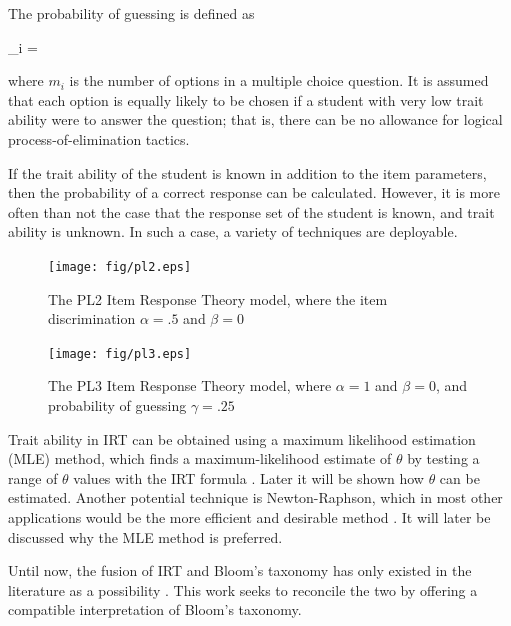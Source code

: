 The probability of guessing is defined as

\begin{equations}
  \gamma_i = 
\end{equations}

where $m_i$ is the number of options in a multiple choice question.  It is
assumed that each option is equally likely to be chosen if a student with
very low trait ability were to answer the question; that is, there can be
no allowance for logical process-of-elimination tactics.

If the trait ability of the student is known in addition to the item
parameters, then the probability of a correct response can be calculated.
However, it is more often than not the case that the response set of the
student is known, and trait ability is unknown.  In such a case, a variety of
techniques are deployable.

\begin{figure}[p!]
 \label{fig:pl2}
 \texttt{[image: fig/pl2.eps]} 
 \caption{The PL2 Item Response Theory model, where the item discrimination 
 $\alpha=.5$ and $\beta=0$}
\end{figure}

\begin{figure}[p!]
 \label{fig:pl3}
 \texttt{[image: fig/pl3.eps]} 
 \caption{The PL3 Item Response Theory model, where $\alpha=1$ and $\beta=0$,
 and probability of guessing $\gamma=.25$}
\end{figure}

Trait ability in IRT can be obtained using a maximum likelihood estimation
(MLE) method, which finds a maximum-likelihood estimate of $\theta$ by testing
a range of $\theta$ values with the IRT formula \cite{baker2004}.  Later it
will be shown how $\theta$ can be estimated.  Another potential technique is
Newton-Raphson, which in most other applications would be the more efficient
and desirable method \cite{baker2004}.  It will later be discussed why the MLE
method is preferred.


Until now, the fusion of IRT and Bloom's taxonomy has only existed in the
literature as a possibility \cite{sitthisak}.  This work seeks to reconcile
the two by offering a compatible interpretation of Bloom's taxonomy.

